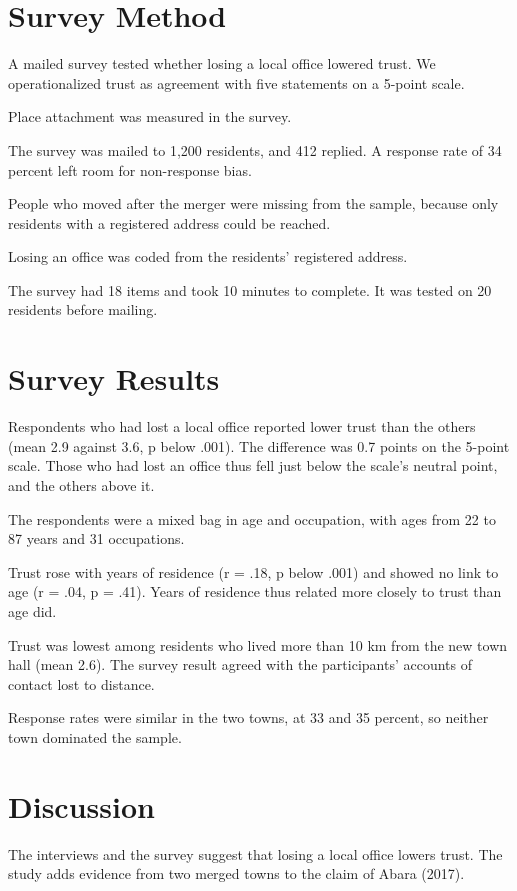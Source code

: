 \section{Survey Method}

A mailed survey tested whether losing a local office lowered trust. We operationalized trust as agreement with five statements on a 5-point scale.

Place attachment was measured in the survey.

The survey was mailed to 1,200 residents, and 412 replied. A response rate of 34 percent left room for non-response bias.

People who moved after the merger were missing from the sample, because only residents with a registered address could be reached.

Losing an office was coded from the residents' registered address.

The survey had 18 items and took 10 minutes to complete. It was tested on 20 residents before mailing.

\section{Survey Results}

Respondents who had lost a local office reported lower trust than the others (mean 2.9 against 3.6, p below .001). The difference was 0.7 points on the 5-point scale. Those who had lost an office thus fell just below the scale's neutral point, and the others above it.

The respondents were a mixed bag in age and occupation, with ages from 22 to 87 years and 31 occupations.

Trust rose with years of residence (r = .18, p below .001) and showed no link to age (r = .04, p = .41). Years of residence thus related more closely to trust than age did.

Trust was lowest among residents who lived more than 10 km from the new town hall (mean 2.6). The survey result agreed with the participants' accounts of contact lost to distance.

Response rates were similar in the two towns, at 33 and 35 percent, so neither town dominated the sample.

\section{Discussion}

The interviews and the survey suggest that losing a local office lowers trust. The study adds evidence from two merged towns to the claim of Abara (2017).

